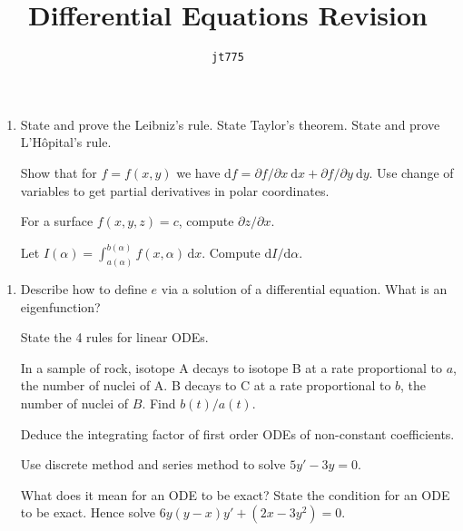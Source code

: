 \documentclass[11pt]{article}
\title{\textbf{Differential Equations Revision}}
\author{\texttt{jt775}}
\date{\null}
\newcommand{\rmd}{\mathrm{d}}
\newlength{\qspace}
\newcounter{qnumber}
\newenvironment{question}%
 {\vspace{\qspace}
  \begin{enumerate}[\bfseries 1\quad][10]%
    \setcounter{enumi}{\value{qnumber}}%
    \item%
 }
{
  \end{enumerate}
  \filbreak
  \stepcounter{qnumber}
 }
\begin{document}
\maketitle
\vspace{-1.5cm}
\begin{question}
    State and prove the Leibniz's rule. State Taylor's theorem. State and prove L'H\^{o}pital's rule.

    Show that for $ f=f(x,y) $ we have $ \rmd f=\partial f/\partial x\ \rmd x+\partial f/\partial y\ \rmd y  $. Use change of variables to get partial derivatives in polar coordinates.

    For a surface $ f(x,y,z)=c $, compute $ \partial z/\partial x  $.

    Let $ I(\alpha) = \int_{a(\alpha)}^{b(\alpha)} f(x,\alpha) \,\mathrm{d}x$. Compute $ \rmd I/ \rmd \alpha  $.
\end{question}
\begin{question}
  Describe how to define $e$ via a solution of a differential equation. What is an eigenfunction?

  State the 4 rules for linear ODEs.

  In a sample of rock, isotope A decays to isotope B at a rate proportional to $a$, the number of nuclei of A. B decays to C at a rate proportional to $b$, the number of nuclei of $B$. Find $b(t)/a(t)$.

  Deduce the integrating factor of first order ODEs of non-constant coefficients.

  Use discrete method and series method to solve $ 5y'-3y=0 $.

  What does it mean for an ODE to be exact? State the condition for an ODE to be exact. Hence solve $ 6y(y-x)y'+(2x-3y^2)=0 $.
\end{question}
\end{document}
